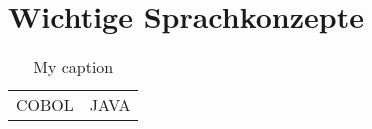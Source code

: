 \section{Wichtige Sprachkonzepte}

\begin{table}[]
\centering
\caption{My caption}
\label{my-label}
\begin{tabular}{|c|c|}
COBOL & JAVA \hline
\end{tabular}
\end{table}